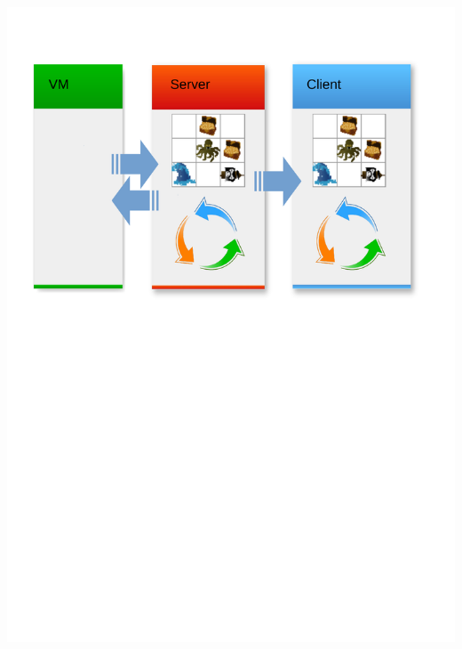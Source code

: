 \begin{frame}
	\begin{center}
		\includegraphics[scale=0.5]{simulation/Simulation3.pdf}
	\end{center}
\end{frame}


